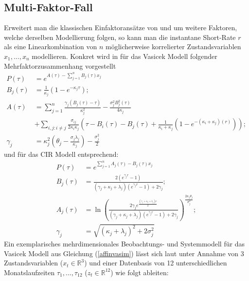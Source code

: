 \documentclass[12pt,a4paper,headsepline,bibliography=totoc,listof=totoc,headinclude=false,footinclude=false,BCOR5mm]{scrreprt} %
\begin{document}
\subsection{Multi-Faktor-Fall}
Erweitert man die klassischen Einfaktorans{\"a}tze von \cite{Vasicek1977} und \cite{Cox1985} um weitere Faktoren, welche derselben Modellierung folgen, so kann man die instantane Short-Rate $r$ als eine Linearkombination von $n$ m{\"o}glicherweise korrelierter Zustandsvariablen $x_{1}, ... , x_{n}$ modellieren. Konkret wird in \cite[S. 18ff]{Bolder2001} f{\"u}r das Vasicek Modell folgender Mehrfaktorzusammenhang vorgestellt
\begin{equation}\label{affinvasim}\begin{split}
P(\tau) & = e^{A(\tau)-\sum^{n}_{j=1}B_{j}(\tau)x_{j}} \\
 B_{j}(\tau) &= \frac{1}{\kappa_{j}} (1- e^{-\kappa_{j}\tau}); \\  A(\tau) & = \sum_{j=1}^{n} \frac{\gamma_{j}(B_{j}(\tau)-\tau)}{\kappa_{j}^2} - \frac{\sigma_{j}^2B_{j}^2(\tau)}{4\kappa_{j}} \\& + \sum_{i,j:i\neq j} \frac{\sigma_{ij}}{2\kappa_{i}\kappa_{j}}\left(\tau - B_{i}(\tau)-B_{j}(\tau) + \frac{1}{\kappa_{i}+\kappa_{j}}\left(1 - e^{-(\kappa_{i}+\kappa_{j})(r)}\right)\right); \\  \gamma_{j} & =\kappa_{j}^2\left(\theta_{j} - \frac{\sigma_{j}\lambda_{j}}{\kappa_{j}}\right) - \frac{\sigma_{j}^2}{2}
\end{split} \end{equation} und f{\"u}r das CIR Modell entsprechend:
\begin{equation}\label{affincir}\begin{split}
P(\tau) & = e^{\sum^{n}_{j=1}A_{j}(\tau)-B_{j}(\tau)x_{j}} \\
 B_{j}(\tau) & = \frac{2(e^{\gamma_{j} r}-1)}{(\gamma_{j} + \kappa_{j} + \lambda_{j})(e^{\gamma_{j} r}-1)+2\gamma_{j}};\\ A_{j}(\tau) & =\ln\left(\frac{2\gamma_{j} e^{\frac{(\gamma_{j} + \kappa_{j} + \lambda_{j})r}{2}} }{(\gamma_{j} + \kappa_{j} + \lambda_{j})(e^{\gamma_{j} r}-1)+2\gamma_{j}} \right)^{\frac{2\kappa_{j}\theta_{j}}{\sigma_{j}^{2}}}; \\  \gamma_{j} & =\sqrt{(\kappa_{j} + \lambda_{j})^{2}+2\sigma_{j}^{2}}
\end{split} \end{equation}
Ein exemplarisches mehrdimensionales Beobachtungs- und Systemmodell f{\"u}r das Vasicek Modell aus Gleichung (\ref{affinvasim}) l{\"a}sst sich laut \cite[S. 29ff]{Bolder2001} unter Annahme von 3 Zustandsvariablen ($x_t \in \mathbb{R}^{3}$) und einer Datenbasis von 12 unterschiedlichen Monatslaufzeiten $\tau_{1}, ..., \tau_{12}$ ($z_t \in \mathbb{R}^{12}$) wie folgt ableiten:
\end{document}
